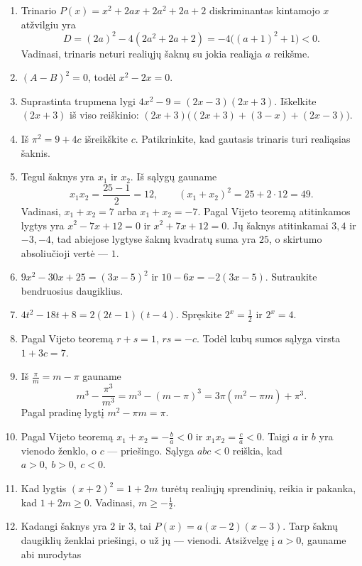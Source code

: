 \documentclass[11pt,a4paper]{scrartcl}
\begin{document}
\begin{enumerate}
    \[
    D=(a-1)^2-4(a+2).
    \]
    Kai $a=6$, $D=-7<0$, tad šaknys nėra realiosios.
    Kai $a=-2$, $D=9\ge0$, o trinaris yra
    $P(x)=x^2-3x=x(x-3)$, kurio šaknys $0$ ir $3$.
    Jų kvadratų suma lygi $0^2+3^2=9$, todėl atsakymas $a=-2$.
    \item Trinario $P(x)=x^2+2ax+2a^2+2a+2$ diskriminantas
    kintamojo $x$ atžvilgiu yra
    \[
    D=(2a)^2-4(2a^2+2a+2)
    =-4\bigl((a+1)^2+1\bigr)<0.
    \]
    Vadinasi, trinaris neturi realiųjų šaknų su jokia realiąja
    $a$ reikšme.
    \item $(A-B)^2=0$, todėl $x^2-2x=0$.
    \item Suprastinta trupmena lygi $4x^2-9=(2x-3)(2x+3)$.
    Iškelkite $(2x+3)$ iš viso reiškinio:
    $(2x+3)\bigl((2x+3)+(3-x)+(2x-3)\bigr)$.
    \item Iš $\pi^2=9+4c$ išreikškite $c$.
    Patikrinkite, kad gautasis trinaris turi realiąsias šaknis.
    \item Tegul šaknys yra $x_1$ ir $x_2$. Iš sąlygų gauname
    \[
    x_1x_2=\frac{25-1}{2}=12,\qquad
    (x_1+x_2)^2=25+2\cdot12=49.
    \]
    Vadinasi, $x_1+x_2=7$ arba $x_1+x_2=-7$. Pagal Vijeto teoremą
    atitinkamos lygtys yra $x^2-7x+12=0$ ir $x^2+7x+12=0$.
    Jų šaknys atitinkamai $3,4$ ir $-3,-4$, tad abiejose lygtyse
    šaknų kvadratų suma yra $25$, o skirtumo absoliučioji vertė — $1$.
    \item $9x^2-30x+25=(3x-5)^2$ ir $10-6x=-2(3x-5)$.
    Sutraukite bendruosius daugiklius.
    \item $4t^2-18t+8=2(2t-1)(t-4)$.
    Spręskite $2^x=\frac12$ ir $2^x=4$.
    \item Pagal Vijeto teoremą $r+s=1$, $rs=-c$.
    Todėl kubų sumos sąlyga virsta $1+3c=7$.
    \item Iš $\frac{\pi}{m}=m-\pi$ gauname
    \[
    m^3-\frac{\pi^3}{m^3}
    =m^3-(m-\pi)^3
    =3\pi(m^2-\pi m)+\pi^3.
    \]
    Pagal pradinę lygtį $m^2-\pi m=\pi$.
    \item Pagal Vijeto teoremą $x_1+x_2=-\frac ba<0$ ir
    $x_1x_2=\frac ca<0$. Taigi $a$ ir $b$ yra vienodo ženklo,
    o $c$ — priešingo. Sąlyga $abc<0$ reiškia, kad
    $a>0,\ b>0,\ c<0$.
    \item Kad lygtis $(x+2)^2=1+2m$ turėtų realiųjų sprendinių,
    reikia ir pakanka, kad $1+2m\ge0$. Vadinasi,
    $m\ge-\frac12$.
    \item Kadangi šaknys yra $2$ ir $3$, tai
    $P(x)=a(x-2)(x-3)$. Tarp šaknų daugiklių ženklai priešingi,
    o už jų — vienodi. Atsižvelgę į $a>0$, gauname abi nurodytas

\end{enumerate}
\end{document}
